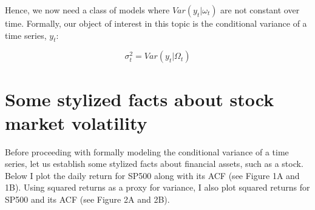 \documentclass[]{book}
\theoremstyle{definition}
\theoremstyle{definition}
\theoremstyle{definition}
\theoremstyle{remark}
\begin{document}
Hence, we now need a class of models where \(Var(y_t|\omega_t)\) are not constant over time. Formally, our object of interest in this topic is the conditional variance of a time series, \(y_t\):

\[\sigma_t^2=Var(y_t|\Omega_t)\]

\hypertarget{some-stylized-facts-about-stock-market-volatility}{%
\section{Some stylized facts about stock market volatility}\label{some-stylized-facts-about-stock-market-volatility}}

Before proceeding with formally modeling the conditional variance of a time series, let us establish some stylized facts about financial assets, such as a stock. Below I plot the daily return for SP500 along with its ACF (see Figure 1A and 1B). Using squared returns as a proxy for variance, I also plot squared returns for SP500 and its ACF (see Figure 2A and 2B).
\end{document}
